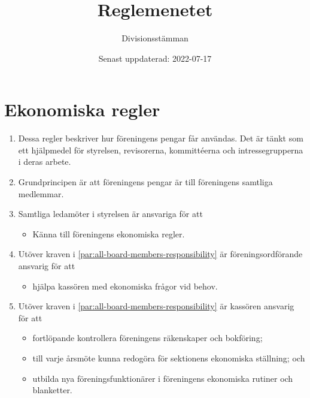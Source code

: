 \documentclass{dvd}
\begin{document}
\title{Reglemenetet}
\author{Divisionsstämman}
\date{Senast uppdaterad: 2022-07-17}

\section{Ekonomiska regler}

\begin{enumerate}[label=\arabic* §, ref=\arabic*]
	\item Dessa regler beskriver hur föreningens pengar får användas.
	      Det är tänkt som ett hjälpmedel för styrelsen, revisorerna, kommittéerna och intressegrupperna i deras arbete.

	\item Grundprincipen är att föreningens pengar är till föreningens samtliga medlemmar.

	\item Samtliga ledamöter i styrelsen är ansvariga för att

	      \begin{itemize}
		      \item Känna till föreningens ekonomiska regler.
	      \end{itemize}
	      \label{par:all-board-members-responsibility}

	\item Utöver kraven i \ref{par:all-board-members-responsibility} är föreningsordförande ansvarig för att

	      \begin{itemize}
		      \item hjälpa kassören med ekonomiska frågor vid behov.
	      \end{itemize}

	\item Utöver kraven i \ref{par:all-board-members-responsibility} är kassören ansvarig för att

	      \begin{itemize}

		      \item fortlöpande kontrollera föreningens räkenskaper och bokföring;

		      \item till varje årsmöte kunna redogöra för sektionens ekonomiska ställning; och

		      \item utbilda nya föreningsfunktionärer i föreningens ekonomiska rutiner och blanketter.

	      \end{itemize}


\end{enumerate}
\end{document}
